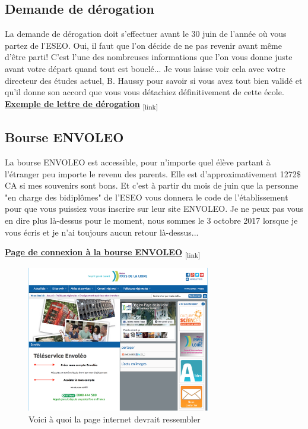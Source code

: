 \subsection{Demande de dérogation}\label{sec:sec3.2.4}
La demande de dérogation doit s'effectuer avant le 30 juin de l'année où vous partez de l'ESEO. Oui, il faut que l'on décide de ne pas revenir avant même d'être parti! C'est l'une des nombreuses informations que l'on vous donne juste avant votre départ quand tout est bouclé... Je vous laisse voir cela avec votre directeur des études actuel, B. Haussy pour savoir si vous avez tout bien validé et qu'il donne son accord que vous vous détachiez définitivement de cette école.
\bigbreak
\href{Annexes/Sherbrooke/Demande_Derogation_COSNEAU_Alexandre.pdf}{\textbf{Exemple de lettre de dérogation}}\textsubscript{  [link]}

\subsection{Bourse ENVOLEO}\label{sec:sec3.2.5}
La bourse ENVOLEO est accessible, pour n'importe quel élève partant à l'étranger peu importe le revenu des parents. Elle est d'approximativement 1272\$ CA si mes souvenirs sont bons. Et c'est à partir du mois de juin que la personne "en charge des bidiplômes" de l'ESEO vous donnera le code de l'établissement pour que vous puissiez vous inscrire sur leur site ENVOLEO. Je ne peux pas vous en dire plus là-dessus pour le moment, nous sommes le 3 octobre 2017 lorsque je vous écris et je n'ai toujours aucun retour là-dessus...

\bigbreak
\href{http://www.envoleo.paysdelaloire.fr}{\textbf{Page de connexion à la bourse ENVOLEO}}\textsubscript{  [link]}
\bigbreak

\begin{figure}[h!]
\centering
\includegraphics[width = 80mm]{figures/Site_Envoleo}
\caption{Voici à quoi la page internet devrait ressembler}
\end{figure}


